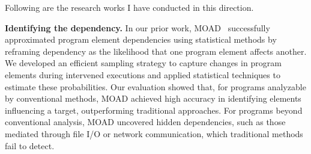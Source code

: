 \documentclass{article}
\begin{document}



\vspace{0.5em} \noindent
Following are the research works I have conducted in this direction.

\vspace{0.5em}
\noindent\textbf{Identifying the dependency.}
In our prior work, MOAD~\cite{leeObservationbasedApproximateDependency2021} successfully approximated program element dependencies using statistical methods by reframing dependency as the likelihood that one program element affects another. We developed an efficient sampling strategy to capture changes in program elements during intervened executions and applied statistical techniques to estimate these probabilities.
% 
Our evaluation showed that, for programs analyzable by conventional methods, MOAD achieved high accuracy in identifying elements influencing a target, outperforming traditional approaches. For programs beyond conventional analysis, MOAD uncovered hidden dependencies, such as those mediated through file I/O or network communication, which traditional methods fail to detect.
\end{document}

